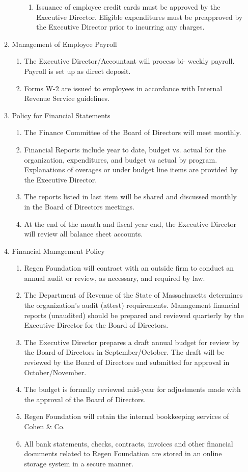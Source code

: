 \documentclass{article}
\begin{document}
\begin{enumerate}
\begin{enumerate}
\begin{enumerate}
\begin{enumerate}
\item Issuance of employee credit cards must be approved by the Executive Director. Eligible expenditures must be preapproved by the Executive Director prior to incurring any charges.
\end{enumerate}
\end{enumerate}
\item Management of Employee Payroll
\begin{enumerate}
\item The Executive Director/Accountant will process bi- weekly payroll. Payroll is set up as direct deposit.
\item Forms W-2 are issued to employees in accordance with Internal Revenue Service guidelines.
\end{enumerate}
\item Policy for Financial Statements
\begin{enumerate}
\item The Finance Committee of the Board of Directors will meet monthly.
\item Financial Reports include year to date, budget vs. actual for the organization, expenditures, and budget vs actual by program. Explanations of overages or under budget line items are provided by the Executive Director.
\item The reports listed in last item will be shared and discussed monthly in the Board of Directors meetings. 
\item At the end of the month and fiscal year end, the Executive Director will review all balance sheet accounts.
\end{enumerate}
\item Financial Management Policy
\begin{enumerate}
\item Regen Foundation will contract with an outside firm to conduct an annual audit or review, as necessary, and required by law. 
\item The Department of Revenue of the State of Massachusetts determines the organization’s audit (attest) requirements. Management financial reports (unaudited) should be prepared and reviewed quarterly by the Executive Director for the Board of Directors. 
\item The Executive Director prepares a draft annual budget for review by the Board of Directors in September/October. The draft will be reviewed by the Board of Directors and submitted for approval in October/November. 
\item The budget is formally reviewed mid-year for adjustments made with the approval of the Board of Directors. 
\item Regen Foundation will retain the internal bookkeeping services of Cohen \& Co.
\item All bank statements, checks, contracts, invoices and other financial documents related to Regen Foundation are stored in an online storage system in a secure manner. 
\end{enumerate}
\end{enumerate}
\end{enumerate}
\end{document}
